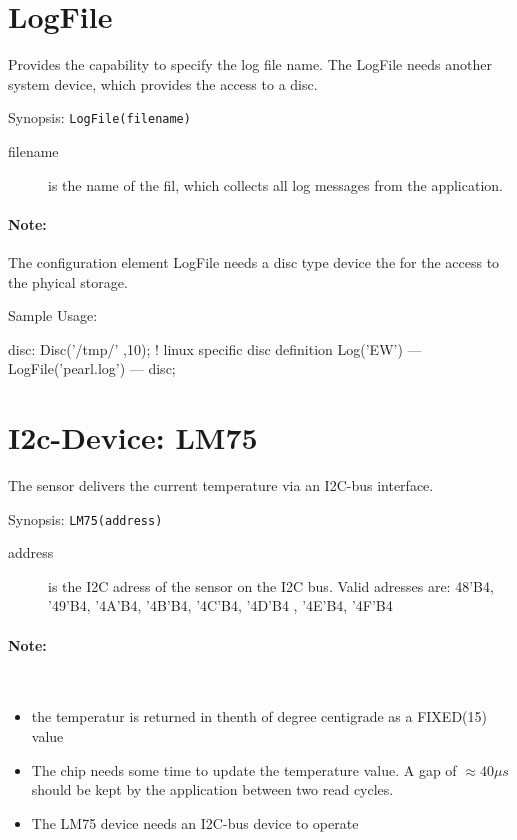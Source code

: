 \section{LogFile}
Provides the capability to specify the log file name.
The LogFile needs another system device, which provides the access to a 
disc.

Synopsis: \texttt{LogFile(filename)}

\begin{description}
\item[filename]  is the name of the fil, which collects all log messages
   from the application.
\end{description}

\paragraph{Note:} The configuration element LogFile needs a disc type device
  the for the access to the phyical storage.
 

Sample Usage:
\begin{PEARLCode}
disc: Disc('/tmp/' ,10); ! linux specific disc definition
Log('EW') --- LogFile('pearl.log') --- disc;
\end{PEARLCode}

\section{I2c-Device: LM75}
The sensor delivers the current temperature via an I2C-bus interface.

Synopsis: \texttt{LM75(address)}

\begin{description}
\item[address] is the I2C adress of the sensor on the I2C bus.
   Valid adresses are: 48'B4, '49'B4, '4A'B4, '4B'B4,
            '4C'B4, '4D'B4 , '4E'B4, '4F'B4
\end{description}

\paragraph{Note:}\ 
\begin{itemize}
\item the temperatur is returned in thenth of degree centigrade as a 
    FIXED(15) value
\item The chip needs some time to update the temperature value. A gap of
   $\approx 40\mu s$ should be kept by the application between two read cycles.
\item The LM75 device needs an I2C-bus device to operate
\end{itemize}


